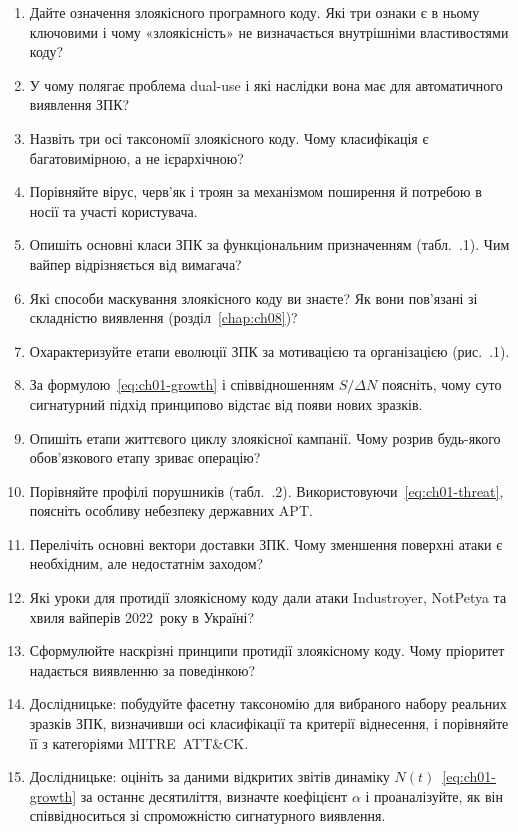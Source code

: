 \selfcheck
\begin{enumerate}
\item Дайте означення злоякісного програмного коду. Які три ознаки є в ньому ключовими і чому «злоякісність» не визначається внутрішніми властивостями коду?
\item У чому полягає проблема dual-use і які наслідки вона має для автоматичного виявлення ЗПК?
\item Назвіть три осі таксономії злоякісного коду. Чому класифікація є багатовимірною, а не ієрархічною?
\item Порівняйте вірус, черв'як і троян за механізмом поширення й потребою в носії та участі користувача.
\item Опишіть основні класи ЗПК за функціональним призначенням (табл.~\thechapter.1). Чим вайпер відрізняється від вимагача?
\item Які способи маскування злоякісного коду ви знаєте? Як вони пов'язані зі складністю виявлення (розділ~\ref{chap:ch08})?
\item Охарактеризуйте етапи еволюції ЗПК за мотивацією та організацією (рис.~\thechapter.1).
\item За формулою~\eqref{eq:ch01-growth} і співвідношенням $S/\Delta N$ поясніть, чому суто сигнатурний підхід принципово відстає від появи нових зразків.
\item Опишіть етапи життєвого циклу злоякісної кампанії. Чому розрив будь-якого обов'язкового етапу зриває операцію?
\item Порівняйте профілі порушників (табл.~\thechapter.2). Використовуючи~\eqref{eq:ch01-threat}, поясніть особливу небезпеку державних APT.
\item Перелічіть основні вектори доставки ЗПК. Чому зменшення поверхні атаки є необхідним, але недостатнім заходом?
\item Які уроки для протидії злоякісному коду дали атаки Industroyer, NotPetya та хвиля вайперів 2022~року в Україні?
\item Сформулюйте наскрізні принципи протидії злоякісному коду. Чому пріоритет надається виявленню за поведінкою?
\item Дослідницьке: побудуйте фасетну таксономію для вибраного набору реальних зразків ЗПК, визначивши осі класифікації та критерії віднесення, і порівняйте її з категоріями MITRE~ATT\&CK.
\item Дослідницьке: оцініть за даними відкритих звітів динаміку $N(t)$~\eqref{eq:ch01-growth} за останнє десятиліття, визначте коефіцієнт $\alpha$ і проаналізуйте, як він співвідноситься зі спроможністю сигнатурного виявлення.
\end{enumerate}
